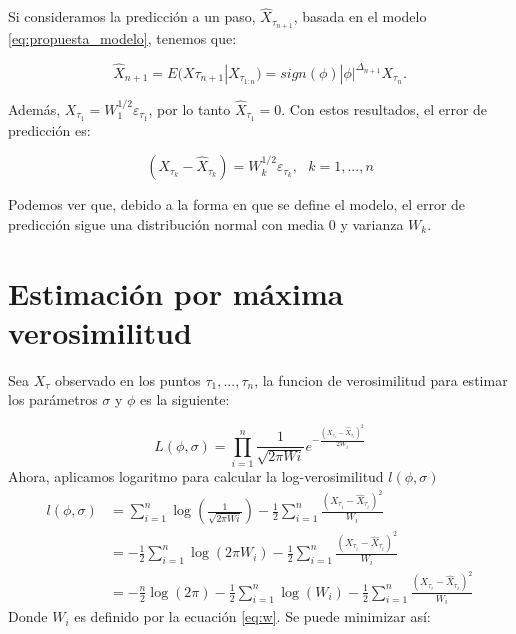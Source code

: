Si consideramos la predicción a un paso, $\hat{X}_{\tau_{n+1}}$, basada en el modelo \ref{eq:propuesta_modelo}, tenemos que:

\begin{equation}
\hat{X}_{n+1} = E(X{\tau_{n+1}}|X_{\tau_{1:n}}) = sign(\phi)|\phi|^{\Delta_{n+1}}X_{\tau_{n}}.
\end{equation}

Además, $X_{\tau_1} = W_1^{1/2}\varepsilon_{\tau_1}$, por lo tanto $\hat{X}_{\tau_1}=0$. Con estos resultados, el error de predicción es:

\begin{equation}
(X_{\tau_k} - \hat{X}_{\tau_k}) = W_{k}^{1/2}\varepsilon_{\tau_k}, \text{ } k=1,...,n
\end{equation}

Podemos ver que, debido a la forma en que se define el modelo, el error de predicción sigue una distribución normal con media 0 y varianza $W_k$.

\section{Estimación por máxima verosimilitud}

Sea $X_\tau$ observado en los puntos $\tau_1, ..., \tau_n$, la funcion de verosimilitud para estimar los
parámetros $\sigma$ y $\phi$ es la siguiente:

\begin{equation}
   L(\phi, \sigma) = \prod_{i=1}^{n}\frac{1}{\sqrt{2\pi Wi}}e^{-\frac{\left( X_{\tau_i} - \hat{X}_{\tau_i}\right)^2}{2W_i}}
\end{equation}
Ahora, aplicamos logaritmo para calcular la log-verosimilitud $l(\phi,\sigma)$
\begin{equation}
   \begin{split}
       l(\phi,\sigma) &= \sum_{i=1}^{n}\log\left(\frac{1}{\sqrt{2\pi Wi}}\right) -\frac{1}{2}\sum_{i=1}^{n}\frac{\left( X_{\tau_i} - \hat{X}_{\tau_i}\right)^2}{W_i}\\
                      &= -\frac{1}{2}\sum_{i=1}^{n}\log\left(2\pi W_i\right) -\frac{1}{2}\sum_{i=1}^{n}\frac{\left( X_{\tau_i} - \hat{X}_{\tau_i}\right)^2}{W_i}\\
                      &= -\frac{n}{2}\log(2\pi)-\frac{1}{2}\sum_{i=1}^{n}\log(W_i)  -\frac{1}{2}\sum_{i=1}^{n}\frac{\left( X_{\tau_i} - \hat{X}_{\tau_i}\right)^2}{W_i}
   \end{split}
   \label{eq:LogLikehod}
\end{equation}
Donde $W_i$ es definido por la ecuación \ref{eq:w}. Se puede minimizar así:

